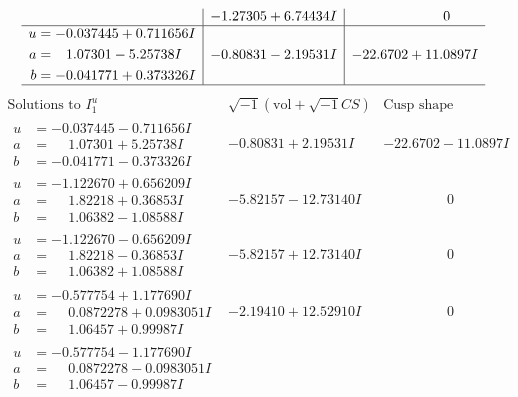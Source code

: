 \documentclass[1p]{elsarticle_modified}
\theoremstyle{definition}
\newcommand{\I}{\sqrt{-1}}
\begin{document}
$$\begin{array}{c|c|c}
 & -1.27305 + 6.74434 I & \phantom{-0.000000 } 0 \\ \hline\begin{aligned}
u &= -0.037445 + 0.711656 I \\
a &= \phantom{-}1.07301 - 5.25738 I \\
b &= -0.041771 + 0.373326 I\end{aligned}
 & -0.80831 - 2.19531 I & -22.6702 + 11.0897 I\\
 \hline 
 \end{array}$$\newpage$$\begin{array}{c|c|c}  
\text{Solutions to }I^u_{1}& \I (\text{vol} + \sqrt{-1}CS) & \text{Cusp shape}\\
 \hline 
\begin{aligned}
u &= -0.037445 - 0.711656 I \\
a &= \phantom{-}1.07301 + 5.25738 I \\
b &= -0.041771 - 0.373326 I\end{aligned}
 & -0.80831 + 2.19531 I & -22.6702 - 11.0897 I \\ \hline\begin{aligned}
u &= -1.122670 + 0.656209 I \\
a &= \phantom{-}1.82218 + 0.36853 I \\
b &= \phantom{-}1.06382 - 1.08588 I\end{aligned}
 & -5.82157 - 12.73140 I & \phantom{-0.000000 } 0 \\ \hline\begin{aligned}
u &= -1.122670 - 0.656209 I \\
a &= \phantom{-}1.82218 - 0.36853 I \\
b &= \phantom{-}1.06382 + 1.08588 I\end{aligned}
 & -5.82157 + 12.73140 I & \phantom{-0.000000 } 0 \\ \hline\begin{aligned}
u &= -0.577754 + 1.177690 I \\
a &= \phantom{-}0.0872278 + 0.0983051 I \\
b &= \phantom{-}1.06457 + 0.99987 I\end{aligned}
 & -2.19410 + 12.52910 I & \phantom{-0.000000 } 0 \\ \hline\begin{aligned}
u &= -0.577754 - 1.177690 I \\
a &= \phantom{-}0.0872278 - 0.0983051 I \\
b &= \phantom{-}1.06457 - 0.99987 I\end{aligned}

\end{array}$$
\end{document}
